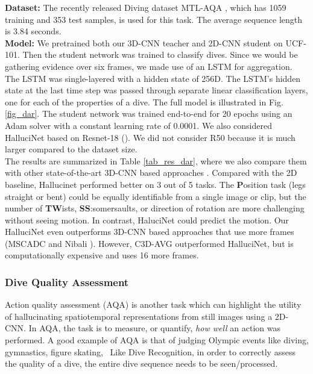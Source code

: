 \documentclass[10pt,twocolumn,letterpaper]{article}
\begin{document}
\noindent\textbf{Dataset:} The recently released Diving dataset MTL-AQA \cite{mtlaqa}, which has 1059 training and 353 test samples, is used for this task. The average sequence length is 3.84 seconds. \\

\noindent\textbf{Model:} We pretrained both our 3D-CNN teacher and 2D-CNN student on UCF-101.  Then the student network was trained to classify dives. Since we would be gathering evidence over six frames, we made use of an LSTM \cite{lstm} for aggregation. The LSTM was single-layered with a hidden state of 256D. The LSTM's hidden state at the last time step was passed through separate linear classification layers, one for each of the properties of a dive. The full model is illustrated in Fig. \ref{fig_dar}. The student network was trained end-to-end for 20 epochs using an Adam solver with a constant learning rate of 0.0001. We also considered HalluciNet based on Resnet-18 (). We did not consider R50 because it is much larger compared to the dataset size.\\

The results are summarized in Table \ref{tab_res_dar}, where we also compare them with other state-of-the-art 3D-CNN based approaches \cite{nibali, mtlaqa}. Compared with the 2D baseline, Hallucinet performed better on 3 out of 5 tasks.  The \textbf{P}osition task (legs straight or bent) could be equally identifiable from a single image or clip, but the number of \textbf{TW}ists, \textbf{SS}:somersaults, or direction of rotation are more challenging without seeing motion.  In contrast, HaluciNet could predict the motion.  Our HalluciNet even outperforms 3D-CNN based approaches that use more frames (MSCADC \cite{mtlaqa} and Nibali \etal \cite{nibali}). However, C3D-AVG outperformed HalluciNet, but is computationally expensive and uses 16 more frames.

\subsubsection{Dive Quality Assessment}
\label{exp_aqa}
Action quality assessment (AQA) is another task which can highlight the utility of hallucinating spatiotemporal representations from still images using a 2D-CNN. In AQA, the task is to measure, or quantify, \textit{how well} an action was performed. A good example of AQA is that of judging Olympic events like diving, gymnastics, figure skating, \etc ~Like Dive Recognition, in order to correctly assess the quality of a dive, the entire dive sequence needs to be seen/processed. \\
\end{document}
